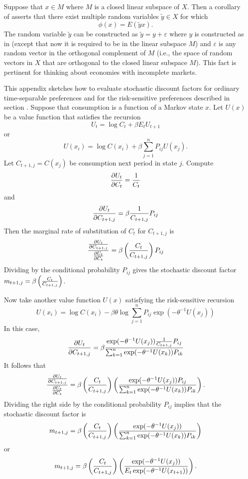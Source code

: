 \medskip

  Suppose that $x \in M$ where $M$ is a closed linear subspace of $X$.  Then a corollary of  asserts that there exist multiple random variables $\tilde y \in X$ for which
$$ \phi(x ) = E (\tilde y x). $$
The random variable $\tilde y$ can be constructed as $\tilde y = y + \varepsilon$ where $y$ is constructed as in  (except that now
it is required to be in the linear subspace $M$) and $\varepsilon$ is any random vector in the orthogonal complement of $M$ (i.e., the space
of random vectors in $X$ that are orthogonal to the closed linear subspace $M$).  This fact is pertinent for thinking about economies with incomplete
markets.


This appendix sketches how to evaluate stochastic discount factors for ordinary
time-separable preferences and for the  risk-sensitive preferences described in section
.
Suppose that consumption is a function of a Markov state $x$.  Let $U(x)$ be
a value function that satisfies the recursion
$$ U_t = \log C_t +  \beta E_t U_{t+1} $$
or
$$ U(x_i) = \log C(x_i) + \beta \sum_{j=1}^n  P_{ij} U (x_j) .$$
Let $C_{t+1,j} = C(x_j)$ be consumption next period in state $j$.
Compute
$$ {\partial U_t \over \partial C_t} = {1 \over C_t }$$
and
$$ {\partial U_t \over \partial C_{t+1,j}} = \beta {1 \over C_{t+1, j}} P_{ij} $$
Then the marginal rate of substitution  of $C_t$ for $C_{t+1,j}$ is
$$ {{\partial U_t \over \partial C_{t+1,j}} \over {\partial U_t \over \partial C_t} }
= \beta \left({C_t \over C_{t+1,j} } \right)P_{ij} $$
Dividing by the conditional probability $P_{ij}$ gives the stochastic discount factor
$m_{t+1,j} = \beta \left({C_t \over C_{t+1,j} } \right)$.

Now take another value function $U(x)$ satisfying the risk-sensitive recursion
$$ U(x_i) = \log C(x_i) - \beta \theta \log \sum_{j=1}^n P_{ij} \exp\left( - \theta^{-1} U(x_j) \right) $$
In this case,
$$ {\partial U_t \over \partial C_{t+1,j}} = \beta { \exp( - \theta^{-1} U(x_j)) {1 \over C_{t+1,j}} P_{ij} \over \sum_{k=1}^n \exp( - \theta^{-1} U(x_k)) P_{ik}} $$
It follows that
$$ {{\partial U_t \over \partial C_{t+1,j}} \over {\partial U_t \over \partial C_t} }  =
\beta \left( {C_t \over C_{t+1,j}} \right) \left({ \exp( - \theta^{-1} U(x_j))  P_{ij} \over \sum_{k=1}^n \exp( - \theta^{-1} U(x_k))P_{ik}} \right) .$$
Dividing  the right side by the conditional  probability $P_{ij}$ implies that the stochastic discount factor is
$$ m_{t+1,j} = \beta \left({C_t \over C_{t+1,j}} \right) \left( { \exp( - \theta^{-1} U(x_j))  \over \sum_{k=1}^n \exp( - \theta^{-1} U(x_k))P_{ik}} \right)$$
or
$$ m_{t+1,j} = \beta \left( {C_t \over C_{t+1,j}} \right) \left({ \exp( - \theta^{-1} U(x_j))  \over E_t \exp( - \theta^{-1} U(x_{t+1}))} \right). $$

